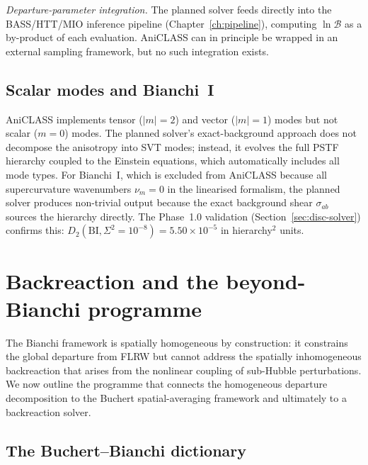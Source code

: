 \emph{Departure-parameter integration.}  The planned
solver feeds directly into the BASS/HTT/MIO inference
pipeline (Chapter~\ref{ch:pipeline}), computing
$\ln \mathcal{B}$ as a by-product of each evaluation.
AniCLASS can in principle be wrapped in an external
sampling framework, but no such integration exists.


\subsection{Scalar modes and Bianchi~I}
\label{sec:scalar-modes}

AniCLASS implements tensor ($|m| = 2$) and vector
($|m| = 1$) modes but not scalar ($m = 0$) modes.
The planned solver's exact-background approach does not
decompose the anisotropy into SVT modes; instead, it
evolves the full PSTF hierarchy coupled to the Einstein
equations, which automatically includes all mode types.
For Bianchi~I, which is excluded from AniCLASS because
all supercurvature wavenumbers $\nu_m = 0$ in the
linearised formalism, the planned solver produces
non-trivial output because the exact background shear
$\sigma_{ab}$ sources the hierarchy directly.  The
Phase~1.0 validation (Section~\ref{sec:disc-solver})
confirms this: $D_2(\mathrm{BI}, \Sigma^2 = 10^{-8})
= 5.50 \times 10^{-5}$ in hierarchy$^2$ units.


\section{Backreaction and the beyond-Bianchi programme}
\label{sec:backreaction-programme}

The Bianchi framework is spatially homogeneous by
construction: it constrains the global departure from
FLRW but cannot address the spatially inhomogeneous
backreaction that arises from the nonlinear coupling of
sub-Hubble perturbations.  We now outline the programme
that connects the homogeneous departure decomposition
to the Buchert spatial-averaging framework and ultimately
to a backreaction solver.


\subsection{The Buchert--Bianchi dictionary}
\label{sec:buchert-bianchi}

